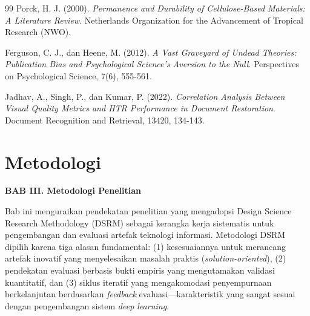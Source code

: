 \documentclass[12pt,a4paper]{book}
\begin{document}
\begin{thebibliography}{99}
Porck, H. J. (2000).
\textit{Permanence and Durability of Cellulose-Based Materials: A Literature Review}.
Netherlands Organization for the Advancement of Tropical Research (NWO).


Ferguson, C. J., dan Heene, M. (2012).
\textit{A Vast Graveyard of Undead Theories: Publication Bias and Psychological Science's Aversion to the Null}.
Perspectives on Psychological Science, 7(6), 555-561.

Jadhav, A., Singh, P., dan Kumar, P. (2022).
\textit{Correlation Analysis Between Visual Quality Metrics and HTR Performance in Document Restoration}.
Document Recognition and Retrieval, 13420, 134-143.

\end{thebibliography}


\chapter{Metodologi}

\sloppy

\vspace{2cm}
\begin{center}
{\fontsize{14}{16.8}\selectfont\textbf{BAB III. Metodologi Penelitian}}\\[1em]
\end{center}
\label{sec:metodologi}
\setcounter{section}{3}
\setcounter{subsection}{0}
\vspace{2em}

Bab ini menguraikan pendekatan penelitian yang mengadopsi Design Science Research Methodology (DSRM) sebagai kerangka kerja sistematis untuk pengembangan dan evaluasi artefak teknologi informasi. Metodologi DSRM dipilih karena tiga alasan fundamental: (1) kesesuaiannya untuk merancang artefak inovatif yang menyelesaikan masalah praktis (\textit{solution-oriented}), (2) pendekatan evaluasi berbasis bukti empiris yang mengutamakan validasi kuantitatif, dan (3) siklus iteratif yang mengakomodasi penyempurnaan berkelanjutan berdasarkan \textit{feedback} evaluasi---karakteristik yang sangat sesuai dengan pengembangan sistem \textit{deep learning}.
\end{document}
